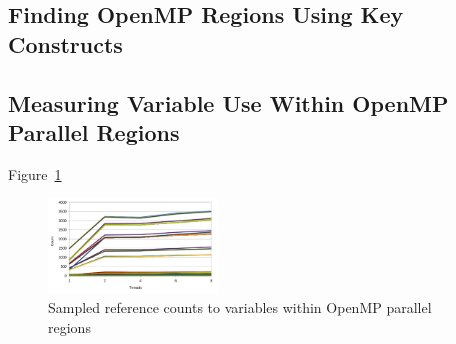\subsection{Finding OpenMP Regions Using Key Constructs}

\subsection{Measuring Variable Use Within OpenMP Parallel Regions}

Figure~\ref{fig:openmp-refcount}

\begin{figure}
\begin{center}
\includegraphics[width=0.4\textwidth]{images/cp2k-omp-inc-full.pdf}
\end{center}
\caption{Sampled reference counts to variables within OpenMP parallel regions}
\label{fig:openmp-refcount}
\end{figure}
